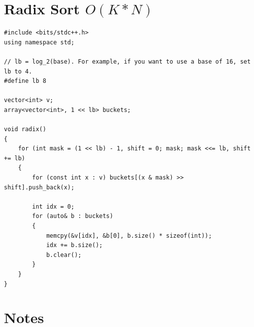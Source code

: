 \documentclass[12pt]{book}
\begin{document}
\section{Radix Sort $O(K * N)$}
\begin{verbatim}
#include <bits/stdc++.h>
using namespace std;

// lb = log_2(base). For example, if you want to use a base of 16, set lb to 4.
#define lb 8

vector<int> v;
array<vector<int>, 1 << lb> buckets;

void radix()
{
	for (int mask = (1 << lb) - 1, shift = 0; mask; mask <<= lb, shift += lb)
	{
		for (const int x : v) buckets[(x & mask) >> shift].push_back(x);
		
		int idx = 0;
		for (auto& b : buckets)
		{
			memcpy(&v[idx], &b[0], b.size() * sizeof(int));
			idx += b.size();
			b.clear();
		}
	}
}
\end{verbatim}

\section{Notes}
\end{document}
